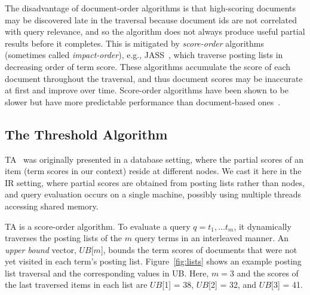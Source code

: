 The disadvantage of  document-order algorithms is that high-scoring documents may  be discovered late in the traversal because document ids  are not correlated with query relevance,
and so the algorithm does not always produce useful partial results before it completes.
This is mitigated by \emph{score-order} algorithms (sometimes called \emph{impact-order}), e.g.,  JASS~\cite{Lin:2015}, which traverse posting lists in decreasing order of term score. 
These algorithms accumulate the score of each document throughout the traversal, and thus document scores may be inaccurate at first and improve over time. 
Score-order algorithms have been shown to be slower but  have more predictable performance than document-based ones~\cite{Crane:2017}.

\subsection{The Threshold Algorithm}

TA~\cite{Fagin:2003} was originally presented in a database setting, where the partial scores of an item (term scores  in our context)  reside at different nodes. We cast it here in the IR setting, where partial scores are obtained from posting lists rather than nodes, and query evaluation occurs on a single machine, possibly using multiple threads accessing shared memory. 

TA is a score-order algorithm.
To evaluate a query $q = t_1, \dots t_m$, it dynamically traverses the posting lists of the $m$ query terms in an interleaved manner. 
An \emph{upper bound} vector, $UB$[$m$], 
bounds the term scores of documents that were not yet visited in each term's posting list. 
%
Figure~\ref{fig:lists} shows
an example posting list traversal and the corresponding values in UB. Here, $m=3$ and the scores of the last traversed items in each list are $UB$[1] = 38, $UB$[2] = 32, and $UB$[3] = 41. 



